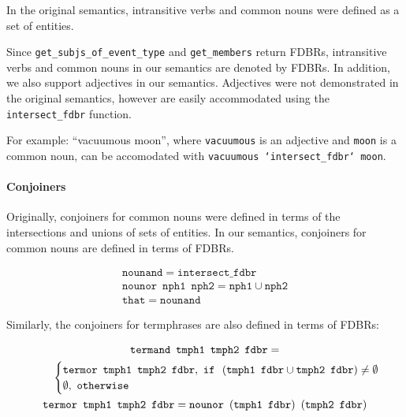 \documentclass[../main.tex]{subfiles}
\begin{document}
In the original semantics, intransitive verbs and common nouns were defined as a set of entities.

Since \texttt{get\_subjs\_of\_event\_type} and \texttt{get\_members} return
FDBRs, intransitive verbs and common nouns in our semantics are denoted by FDBRs.
In addition, we also support adjectives in our semantics. 
Adjectives were not demonstrated in the original semantics, however are easily accommodated using the \texttt{intersect\_fdbr} function.

For example: ``vacuumous moon'', where \texttt{vacuumous} is an adjective
and \texttt{moon} is a common noun, can be accomodated with
\texttt{vacuumous `intersect\_fdbr` moon}.


\paragraph{Conjoiners}

Originally, conjoiners for common nouns were defined in terms of the intersections and unions
of sets of entities.  In our semantics, conjoiners for common nouns are defined in terms
of FDBRs.

\begin{gather*}
    \mathtt{nounand} = \mathtt{intersect\_fdbr} \\
    \mathtt{nounor}\enspace \mathtt{nph1}\enspace \mathtt{nph2} = \mathtt{nph1} \cup \mathtt{nph2} \\
    \mathtt{that} = \mathtt{nounand}
\end{gather*}

Similarly, the conjoiners for termphrases are also defined in terms of FDBRs:

\begin{gather*}
  \mathtt{termand}\enspace \mathtt{tmph1}\enspace \mathtt{tmph2}\enspace \mathtt{fdbr} = \\ \indent\indent
  \begin{cases}
    \mathtt{termor}\enspace \mathtt{tmph1}\enspace \mathtt{tmph2}\enspace \mathtt{fdbr},\ \mathtt{if} \enspace \left(\mathtt{tmph1}\enspace \mathtt{fdbr} \cup
    \mathtt{tmph2}\enspace \mathtt{fdbr}\right) \neq \mathtt{\emptyset} \\
    \emptyset,\ \mathtt{otherwise}
  \end{cases} \\
  \mathtt{termor}\enspace \mathtt{tmph1} \enspace \mathtt{tmph2} \enspace \mathtt{fdbr} = \mathtt{nounor}\enspace (\mathtt{tmph1}\enspace \mathtt{fdbr}) \enspace (\mathtt{tmph2} \enspace \mathtt{fdbr})
\end{gather*}
\end{document}
